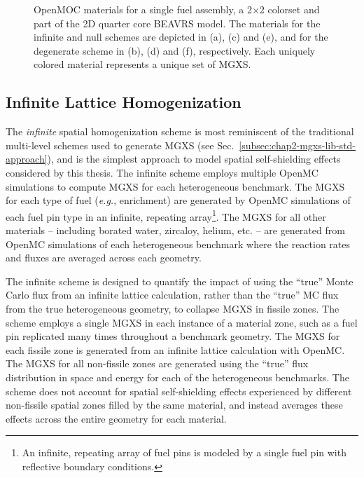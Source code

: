 \begin{figure}[h!]
\begin{subfigure}{.45\textwidth}
  \caption{}
  \label{fig:chap8-full-core-degenerate-materials}
\end{subfigure}
\caption[Depiction of infinite, null and degenerate spatial homogenization schemes]{OpenMOC materials for a single fuel assembly, a 2$\times$2 colorset and part of the 2D quarter core \ac{BEAVRS} model. The materials for the infinite and null schemes are depicted in (a), (c) and (e), and for the degenerate scheme in (b), (d) and (f), respectively. Each uniquely colored material represents a unique set of \ac{MGXS}.}
\label{fig:chap8-homogenization-schemes}
\end{figure}

\subsection{Infinite Lattice Homogenization}
\label{subsec:chap8-infinite}

The \textit{infinite} spatial homogenization scheme is most reminiscent of the traditional multi-level schemes used to generate \ac{MGXS} (see Sec.~\ref{subsec:chap2-mgxs-lib-std-approach}), and is the simplest approach to model spatial self-shielding effects considered by this thesis. The infinite scheme employs multiple OpenMC simulations to compute \ac{MGXS} for each heterogeneous benchmark. The \ac{MGXS} for each type of fuel (\textit{e.g.}, enrichment) are generated by OpenMC simulations of each fuel pin type in an infinite, repeating array\footnote{An infinite, repeating array of fuel pins is modeled by a single fuel pin with reflective boundary conditions.}. The \ac{MGXS} for all other materials -- including borated water, zircaloy, helium, etc. -- are generated from OpenMC simulations of each heterogeneous benchmark where the reaction rates and fluxes are averaged across each geometry.

The infinite scheme is designed to quantify the impact of using the ``true'' Monte Carlo flux from an infinite lattice calculation, rather than the ``true'' \ac{MC} flux from the true heterogeneous geometry, to collapse \ac{MGXS} in fissile zones. The scheme employs a single \ac{MGXS} in each instance of a material zone, such as a fuel pin replicated many times throughout a benchmark geometry. The \ac{MGXS} for each fissile zone is generated from an infinite lattice calculation with OpenMC. The \ac{MGXS} for all non-fissile zones are generated using the ``true''  flux distribution in space and energy for each of the heterogeneous benchmarks. The scheme does not account for spatial self-shielding effects experienced by different non-fissile spatial zones filled by the same material, and instead averages these effects across the entire geometry for each material.

